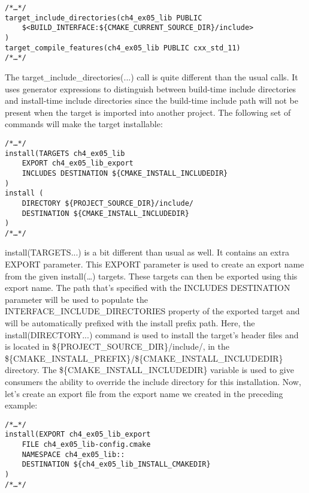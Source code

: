 \begin{lstlisting}[style=styleCMake]
/*…*/
target_include_directories(ch4_ex05_lib PUBLIC
	$<BUILD_INTERFACE:${CMAKE_CURRENT_SOURCE_DIR}/include>
)
target_compile_features(ch4_ex05_lib PUBLIC cxx_std_11)
/*…*/
\end{lstlisting}

The target\_include\_directories(...) call is quite different than the usual calls. It uses generator expressions to distinguish between build-time include directories and install-time include directories since the build-time include path will not be present when the target is imported into another project. The following set of commands will make the target installable:

\begin{lstlisting}[style=styleCMake]
/*…*/
install(TARGETS ch4_ex05_lib
	EXPORT ch4_ex05_lib_export
	INCLUDES DESTINATION ${CMAKE_INSTALL_INCLUDEDIR}
)
install (
	DIRECTORY ${PROJECT_SOURCE_DIR}/include/
	DESTINATION ${CMAKE_INSTALL_INCLUDEDIR}
)
/*…*/
\end{lstlisting}

install(TARGETS...) is a bit different than usual as well. It contains an extra EXPORT parameter. This EXPORT parameter is used to create an export name from the given install(…) targets. These targets can then be exported using this export name. The path that's specified with the INCLUDES DESTINATION parameter will be used to populate the INTERFACE\_INCLUDE\_DIRECTORIES property of the exported target and will be automatically prefixed with the install prefix path. Here, the install(DIRECTORY...) command is used to install the target's header files and is located in \$\{PROJECT\_SOURCE\_DIR\}/include/, in the \$\{CMAKE\_INSTALL\_PREFIX\}/\$\{CMAKE\_INSTALL\_INCLUDEDIR\} directory. The \$\{CMAKE\_INSTALL\_INCLUDEDIR\} variable is used to give consumers the ability to override the include directory for this installation. Now, let's create an export file from the export name we created in the preceding example:

\begin{lstlisting}[style=styleCMake]
/*…*/
install(EXPORT ch4_ex05_lib_export
	FILE ch4_ex05_lib-config.cmake
	NAMESPACE ch4_ex05_lib::
	DESTINATION ${ch4_ex05_lib_INSTALL_CMAKEDIR}
)
/*…*/
\end{lstlisting}

